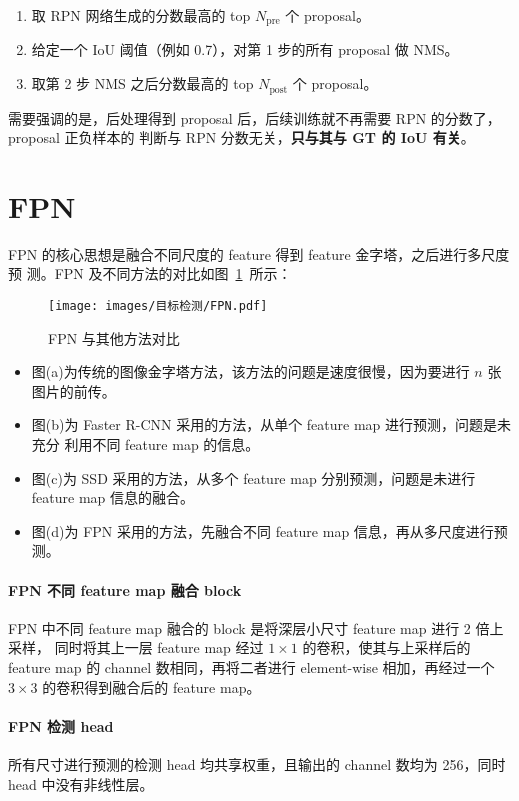 \begin{enumerate}
  \item 取 RPN 网络生成的分数最高的 top $N_{\mathrm{pre}}$ 个 proposal。
  \item 给定一个 IoU 阈值（例如 0.7），对第 1 步的所有 proposal 做 NMS。
  \item 取第 2 步 NMS 之后分数最高的 top $N_{\mathrm{post}}$ 个 proposal。
\end{enumerate}

需要强调的是，后处理得到 proposal 后，后续训练就不再需要 RPN 的分数了，proposal 正负样本的
判断与 RPN 分数无关，\textbf{只与其与 GT 的 IoU 有关}。

\section{FPN}
\label{sec:FPN}

FPN 的核心思想是融合不同尺度的 feature 得到 feature 金字塔，之后进行多尺度预
测。FPN 及不同方法的对比如图~\ref{fig:FPN}~所示：

\begin{figure}[ht]
  \centering
  \texttt{[image: images/目标检测/FPN.pdf]}
  \caption{FPN 与其他方法对比}
  \label{fig:FPN}
\end{figure}

\begin{itemize}
  \item 图(a)为传统的图像金字塔方法，该方法的问题是速度很慢，因为要进行 $n$ 张
    图片的前传。
  \item 图(b)为 Faster R-CNN 采用的方法，从单个 feature map 进行预测，问题是未充分
    利用不同 feature map 的信息。
  \item 图(c)为 SSD 采用的方法，从多个 feature map 分别预测，问题是未进行
    feature map 信息的融合。
  \item 图(d)为 FPN 采用的方法，先融合不同 feature map 信息，再从多尺度进行预测。
\end{itemize}

\paragraph{FPN 不同 feature map 融合 block}
FPN 中不同 feature map 融合的 block 是将深层小尺寸 feature map 进行 2 倍上采样，
同时将其上一层 feature map 经过 $1 \times 1$ 的卷积，使其与上采样后的 feature
map 的 channel 数相同，再将二者进行 element-wise 相加，再经过一个 $3 \times 3$
的卷积得到融合后的 feature map。

\paragraph{FPN 检测 head}
所有尺寸进行预测的检测 head 均共享权重，且输出的 channel 数均为 256，同时 head
中没有非线性层。

